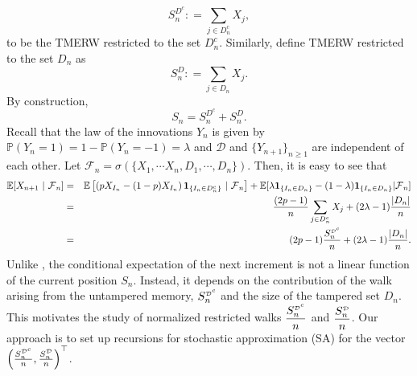 \documentclass{article}
\numberwithin{equation}{section}
\newcommand{\FF}{\mbox{${\mathcal F}$}}
\newcommand{\DD}{\mbox{${\mathcal D}$}}
\newcommand{\1}{\mathbf{1}}
\newcommand{\0}{\mathbf{0}}
\newcommand{\bone}{\mathbf{1}}
\newcommand{\PP}{\mbox{${\mathbb P}$}}
\newcommand{\E}{\mbox{${\mathbb E}$}}
\begin{document}
\begin{equation}
\label{Def: TMERW_Dc}
S_n^{D^c}: = \sum_{j \in D_n^c} X_j,
\end{equation}
to be the TMERW restricted to the set $D_n^c$.
Similarly, define TMERW restricted to the set $D_n$ as 
\begin{equation}
\label{Def: TMERW_D}
S_n^{D}: = \sum_{j \in D_n} X_j.
\end{equation}
By construction, 
\begin{equation}
\label{Eq: S_n_sum_of_restricted_walks}
S_n = S_n^{D^c}+ S_n^{D}.
\end{equation}
Recall that the law of the innovations $Y_n$ is given by  $\PP(Y_n=1)=1-\PP(Y_n=-1)=\lambda$ and $\mathcal{D}$ and $\{Y_{n+1}\}_{n \ge 1}$ are independent of each other. Let $\FF_n = \sigma(\{X_1,\cdots X_n, D_1, \cdots, D_n\})$. Then, it is easy to see that  
\begin{eqnarray}
\label{Eq: conditional_expectation}
      \E[X_{n+1} \ | \ \FF_n] &= &
    \E \left [ \left(pX_{I_{n}}- (1-p)X_{I_{n}}\right)\bone_{\{I_{n} \in D_n^c\}} \ | \ \FF_n \right]+\E [\lambda \bone_{\{I_{n} \in D_n\}}-(1-\lambda) \bone_{\{I_{n} \in D_n\}} | \FF_n] \nonumber \\  
    &=& \frac{(2p-1)}{n}\sum_{j \in D_n^c} X_j + (2\lambda-1) \frac{|D_n|}{n} \nonumber \\ 
    &=& (2p-1) \frac{S_n^{{\tiny \DD}^c}}{n} + (2\lambda-1) \frac{|D_n|}{n}.
\end{eqnarray}
Unlike \cite{coletti2017central}, the conditional expectation of the next increment is not a linear function of the current position $S_n$. Instead, it depends on the contribution of the walk arising from the untampered memory, $S_n^{{\tiny \DD}^c}$ and the size of the tampered set $D_n$. This motivates the study of normalized restricted walks $\dfrac{S_n^{{\tiny \DD}^c}}{n}$ and $\dfrac{S_n^{{\tiny \DD}}}{n}$. Our approach is to set up recursions for stochastic approximation (SA) for the vector $\left(\frac{S_n^{{\tiny \DD}^c}}{n}, \frac{S_n^{{\tiny \DD}}}{n}\right)^\top$.  
\end{document}
